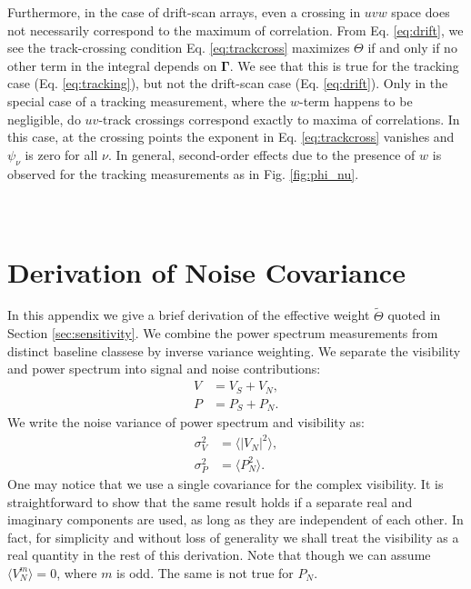 \documentclass[twocolumn,apj,numberedappendix]{emulateapj}
\renewcommand\[{\begin{equation}}
\renewcommand\]{\end{equation}}
\begin{document}
Furthermore, in the case of drift-scan arrays, even a crossing in $uvw$ space does not necessarily correspond to the maximum of correlation. From Eq. \eqref{eq:drift}, we see the track-crossing condition Eq. \eqref{eq:trackcross} maximizes $\Theta$ if and only if no other term in the integral depends on $\boldsymbol{\Gamma}$. We see that this is true for the tracking case (Eq. \eqref{eq:tracking}), but not the drift-scan case (Eq. \eqref{eq:drift}). Only in the special case of a tracking measurement, where the $w$-term happens to be negligible, do $uv$-track crossings correspond exactly to maxima of correlations. In this case, at the crossing points the exponent in Eq. \eqref{eq:trackcross} vanishes and $\psi_\nu$ is zero for all $\nu$. In general, second-order effects due to the presence of $w$ is observed for the tracking measurements as in Fig. \ref{fig:phi_nu}. 


\section{\label{sec:appB}\\Derivation of Noise Covariance \label{sec:appB}}
\label{sec:appB}
In this appendix we give a brief derivation of the effective weight $\widetilde{\Theta}$ quoted in Section \ref{sec:sensitivity}. We combine the power spectrum measurements from distinct baseline classese by inverse variance weighting. We separate the visibility and power spectrum into signal and noise contributions:
\begin{equation}
\begin{aligned}
V &= V_S+V_N,\\
P &= P_S+P_N.
\end{aligned}
\end{equation}
We write the noise variance of power spectrum and visibility as:
\begin{equation}
\begin{aligned}
\sigma_V^2 &= \langle |V_N|^2 \rangle,\\
\sigma_P^2 &= \langle P_N^2 \rangle.
\end{aligned}
\end{equation}
One may notice that we use a single covariance for the complex visibility. It is straightforward to show that the same result holds if a separate real and imaginary components are used, as long as they are independent of each other. In fact, for simplicity and without loss of generality we shall treat the visibility as a real quantity in the rest of this derivation. 
Note that though we can assume $\langle V_N^{m}\rangle=0$, where $m$ is odd. The same is not true for $P_N$. 
\end{document}
